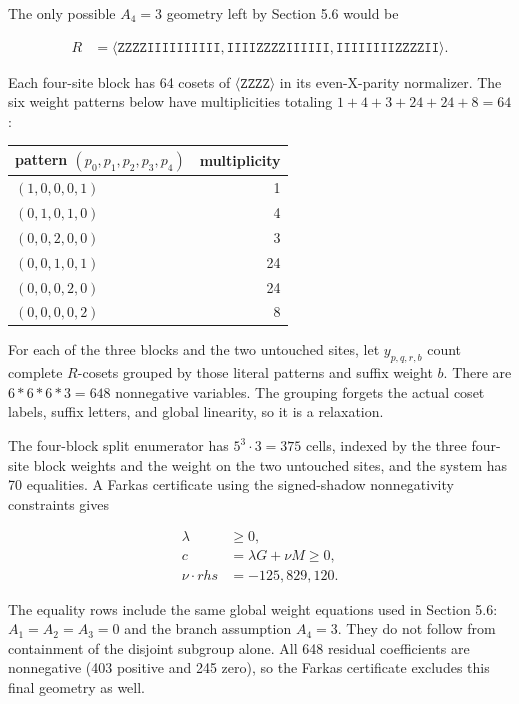 \documentclass[11pt]{article}
\begin{document}
The only possible \(A_{4}=3\) geometry left by Section 5.6 would be

\[
\begin{aligned}
R &=\langle  \mathtt{ZZZZIIIIIIIIII}, \mathtt{IIIIZZZZIIIIII}, \mathtt{IIIIIIIIZZZZII}  \rangle.
\end{aligned}
\]

Each four-site block has 64 cosets of \(\langle \mathtt{ZZZZ} \rangle\) in its even-X-parity normalizer. The six weight patterns below have multiplicities totaling \(1+4+3+24+24+8=64\):

{\def\LTcaptype{none} %
\begin{longtable}[]{@{}lr@{}}
\toprule\noalign{}
pattern \((p_{0},p_{1},p_{2},p_{3},p_{4})\) & multiplicity \\
\midrule\noalign{}
\endhead
\bottomrule\noalign{}
\endlastfoot
\((1,0,0,0,1)\) & 1 \\
\((0,1,0,1,0)\) & 4 \\
\((0,0,2,0,0)\) & 3 \\
\((0,0,1,0,1)\) & 24 \\
\((0,0,0,2,0)\) & 24 \\
\((0,0,0,0,2)\) & 8 \\
\end{longtable}
}

For each of the three blocks and the two untouched sites, let \(y_{p,q,r,b}\) count complete \(R\)-cosets grouped by those literal patterns and suffix weight \(b\). There are \(6*6*6*3=648\) nonnegative variables. The grouping forgets the actual coset labels, suffix letters, and global linearity, so it is a relaxation.

The four-block split enumerator has \(5^3\cdot3=375\) cells, indexed by the three four-site block weights and the weight on the two untouched sites, and the system has 70 equalities. A Farkas certificate using the signed-shadow nonnegativity constraints gives

\[
\begin{aligned}
\lambda  &\ge  0, \\
c &=\lambda G + \nu M  \ge  0, \\
\nu \cdot rhs &=-125{,}829{,}120.
\end{aligned}
\]

The equality rows include the same global weight equations used in Section 5.6: \(A_{1}=A_{2}=A_{3}=0\) and the branch assumption \(A_{4}=3\). They do not follow from containment of the disjoint subgroup alone. All 648 residual coefficients are nonnegative (403 positive and 245 zero), so the Farkas certificate excludes this final geometry as well.
\end{document}
